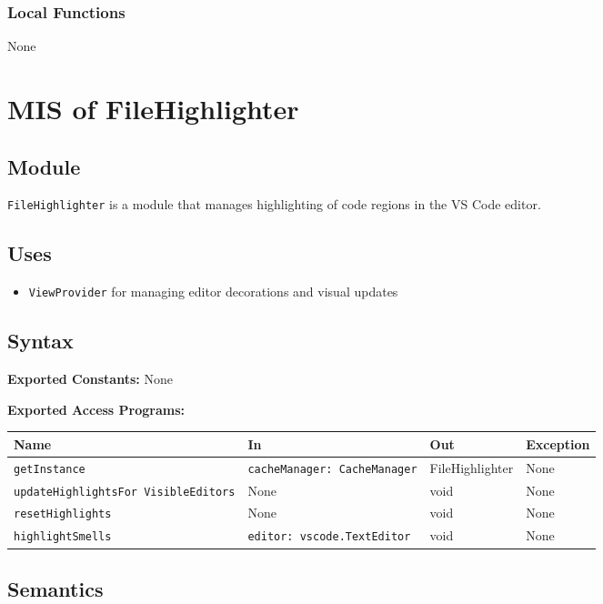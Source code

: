 \documentclass[12pt, titlepage]{article}
\begin{document}
\subsubsection{Local Functions}
None

\section{MIS of FileHighlighter}

\subsection{Module}
\texttt{FileHighlighter} is a module that manages highlighting of code regions in the VS Code editor.

\subsection{Uses}
\begin{itemize}
\item \texttt{ViewProvider} for managing editor decorations and visual updates
\end{itemize}

\subsection{Syntax}

\textbf{Exported Constants:} None

\noindent \textbf{Exported Access Programs:}\\
\begin{tabularx}{\linewidth}{|p{5cm}|>{\raggedright\arraybackslash}X|l|l|}
  \hline
  \textbf{Name} & \textbf{In} & \textbf{Out} & \textbf{Exception} \\
  \hline
  \texttt{getInstance} & \texttt{cacheManager: CacheManager} & FileHighlighter & None \\ \hline
  \texttt{updateHighlightsFor \allowbreak VisibleEditors} & None & void & None \\ \hline
  \texttt{resetHighlights} & None & void & None \\ \hline
  \texttt{highlightSmells} & \texttt{editor: vscode.TextEditor} & void & None \\
  \hline
\end{tabularx}

\subsection{Semantics}
\end{document}
